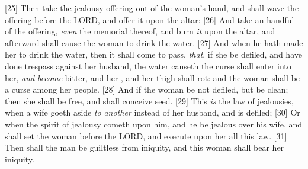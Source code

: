 [25] \textcolor[cmyk]{0.99998,1,0,0}{Then   take the jealousy offering out of the woman's hand, and shall wave the offering before the LORD, and offer it upon the altar:}
[26] \textcolor[cmyk]{0.99998,1,0,0}{And   take an handful of the offering, \emph{even} the memorial thereof, and burn \emph{it} upon the altar, and afterward shall cause the woman to drink the water.}
[27] \textcolor[cmyk]{0.99998,1,0,0}{And when he hath made her to drink the water, then it shall come to pass, \emph{that}, if she be defiled, and have done trespass against her husband,  the water  causeth the curse shall enter into her, \emph{and} \emph{become} bitter, and her , and her thigh shall rot: and the woman shall be a curse among her people.}
[28] \textcolor[cmyk]{0.99998,1,0,0}{And if the woman be not defiled, but be clean; then she shall be free, and shall conceive seed.}
[29] \textcolor[cmyk]{0.99998,1,0,0}{This \emph{is} the law of jealousies, when a wife goeth aside \emph{to} \emph{another} instead of her husband, and is defiled;}
[30] \textcolor[cmyk]{0.99998,1,0,0}{Or when the spirit of jealousy cometh upon him, and he be jealous over his wife, and shall set the woman before the LORD, and   execute upon her all this law.}
[31] \textcolor[cmyk]{0.99998,1,0,0}{Then shall the man be guiltless from iniquity, and this woman shall bear her iniquity.}